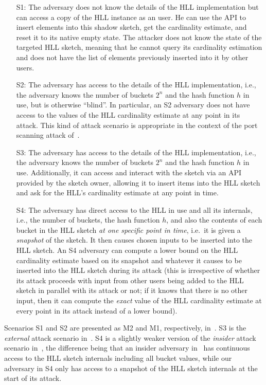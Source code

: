 \documentclass{IEEEtran}
\begin{document}
\begin{itemize}
\item[S1:] The adversary does not know the details of the HLL implementation but can access a copy of the HLL instance as an user. He can use the API to insert elements into this shadow sketch, get the cardinality estimate, and reset it to its native empty state. The attacker does not know the state of the targeted HLL sketch, meaning that he cannot query its cardinality estimation and does not have the list of elements previously inserted into it by other users.
\item[S2:] The adversary has access to the details of the HLL implementation, i.e., the adversary knows the number of buckets $2^n$ and the hash function $h$ in use, but is otherwise ``blind''. In particular, an S2 adversary does not have access to the values of the HLL cardinality estimate at any point in its attack. This kind of attack scenario is appropriate in the context of the port scanning attack of~\cite{portscanhll}.
\item[S3:] The adversary has access to the details of the HLL implementation, i.e., the adversary knows the number of buckets $2^n$ and the hash function $h$ in use. Additionally, it can access and interact with the sketch via an API provided by the sketch owner, allowing it to insert items into the HLL sketch and ask for the HLL's cardinality estimate at any point in time.
\item[S4:] The adversary has direct access to the HLL in use and all its internals, i.e., the number of buckets, the hash function $h$, and also the contents of each bucket in the HLL sketch \emph{at one specific point in time}, i.e.\ it is given a \emph{snapshot} of the sketch. It then causes chosen inputs to be inserted into the HLL sketch. An S4 adversary can compute a lower bound on the HLL cardinality estimate based on its snapshot and whatever it causes to be inserted into the HLL sketch during its attack (this is irrespective of whether its attack proceeds with input from other users being added to the HLL sketch in parallel with its attack or not; if it knows that there is no other input, then it can compute the \emph{exact} value of the HLL cardinality estimate at every point in its attack instead of a lower bound).
\end{itemize}

Scenarios S1 and S2 are presented as M2 and M1, respectively, in~\cite{hllvuln}. S3 is the \textit{external} attack scenario in~\cite{cardestprivacy}. S4 is a slightly weaker version of the \textit{insider} attack scenario in~\cite{cardestprivacy}, the difference being that an insider adversary in~\cite{cardestprivacy} has continuous access to the HLL sketch internals including all bucket values, while our adversary in S4 only has access to a snapshot of the HLL sketch internals at the start of its attack.
\end{document}
